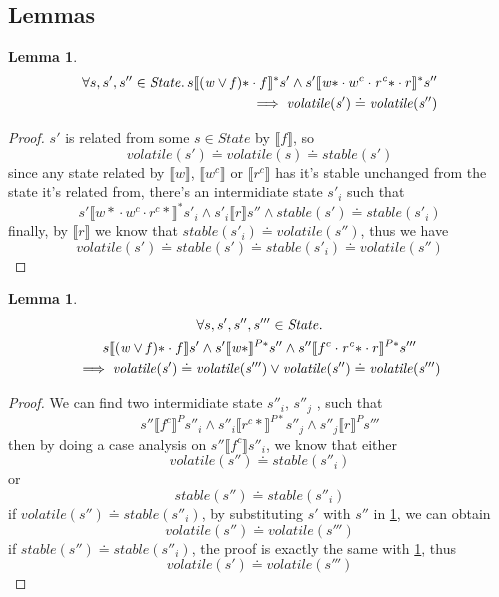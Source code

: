 \documentclass[a4paper,11pt]{article}
\newtheorem{lemma}[theorem]{Lemma}
\theoremstyle{definition}
\begin{document}
\subsection{Lemmas}

\begin{lemma}\label{lemma-2-1}
\begin{align*}
	\forall s, s', s'' \in \mathit{State} \ldotp s \llbracket \mathit{(w \lor f)\ast} \cdot f \rrbracket^* s' \land s' \llbracket \mathit{w\ast} \cdot w^c \cdot \mathit{r^c\ast} \cdot r \rrbracket^* s'' \\
	  \implies \mathit{volatile(s')} \doteq \mathit{volatile(s'')}
\end{align*}
\end{lemma}
\begin{proof}
	$s'$ is related from some $s \in \mathit{State}$ by $\llbracket f \rrbracket$, so
		$$\mathit{volatile(s')} \doteq \mathit{volatile(s)} \doteq \mathit{stable(s')}$$
	since any state related by $\llbracket w \rrbracket$, $\llbracket w^c \rrbracket$ or $\llbracket r^c \rrbracket$ has it's stable unchanged from the state it's related from, there's an intermidiate state $s'_i$ such that
		$$s' \llbracket {w*} \cdot w^c \cdot {r^c *} \rrbracket^* s'_i \land s'_i \llbracket r \rrbracket s'' \land stable(s') \doteq stable(s'_i)$$
	finally, by $\llbracket r \rrbracket$ we know that $\mathit{stable(s'_i) \doteq volatile(s'')}$, thus we have
		$$\mathit{volatile(s') \doteq stable(s') \doteq stable(s'_i) \doteq volatile(s'')}$$
\end{proof}

\begin{lemma}\label{lemma-2-2}
\begin{multline*}
      \forall s, s', s'', s''' \in \mathit{State} \ldotp \\
      s \llbracket \mathit{(w \lor f)\ast} \cdot f \rrbracket s' \land
	  s' \llbracket \mathit{w\ast} \rrbracket^{P*} s'' \land
	  s'' \llbracket f^c \cdot \mathit{r^c\ast} \cdot r \rrbracket^{P*} s'''\\ \implies \mathit{volatile(s')} \doteq \mathit{volatile(s''')} \lor \mathit{volatile(s'')} \doteq \mathit{volatile(s''')}
\end{multline*}
\end{lemma}
\begin{proof}
	We can find two intermidiate state $s''_i$, $s''_j$ , such that $$s'' \llbracket f^c \rrbracket^P s''_i \land s''_i \llbracket r^c* \rrbracket^{P*} s''_j \land s''_j \llbracket r \rrbracket^P s'''$$
	then by doing a case analysis on $s'' \llbracket f^c \rrbracket s''_i$, we know that either $$\mathit{volatile(s'') \doteq stable(s''_i)}$$ or $$\mathit{stable(s'') \doteq stable(s''_i)}$$
	if $\mathit{volatile(s'') \doteq stable(s''_i)}$, by substituting $s'$ with $s''$ in
	\cref{lemma-2-1}, we can obtain $$\mathit{volatile(s'') \doteq volatile(s''')}$$
	if $\mathit{stable(s'') \doteq stable(s''_i)}$, the proof is exactly the same with \cref{lemma-2-1}, thus $$\mathit{volatile(s') \doteq volatile(s''')}$$
\end{proof}
\end{document}
